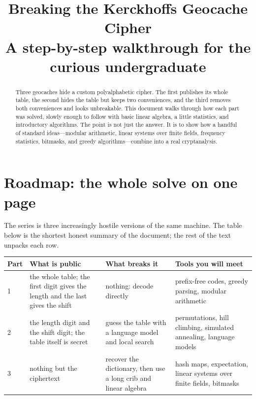 \documentclass[11pt]{article}
\title{Breaking the Kerckhoffs Geocache Cipher\\\large A step-by-step walkthrough for the curious undergraduate}
\author{}
\date{}
\begin{document}
\maketitle

\begin{abstract}
Three geocaches hide a custom polyalphabetic cipher.  The first publishes its
whole table, the second hides the table but keeps two conveniences, and the
third removes both conveniences and looks unbreakable.
This document walks through how each part was solved, slowly enough to follow
with basic linear algebra, a little statistics, and introductory algorithms.
The point is not just the answer.  It is to show how a handful of standard
ideas---modular arithmetic, linear systems over finite fields, frequency
statistics, bitmasks, and greedy algorithms---combine into a real
cryptanalysis.
\end{abstract}

\tableofcontents

\section{Roadmap: the whole solve on one page}\label{sec:roadmap}

The series is three increasingly hostile versions of the same machine.  The
table below is the shortest honest summary of the document; the rest of the
text unpacks each row.

\begin{center}
\small
\setlength{\tabcolsep}{4pt}
\renewcommand{\arraystretch}{1.25}
\begin{tabular}{@{}p{}p{}p{}p{}@{}}
\toprule
\textbf{Part} & \textbf{What is public} & \textbf{What breaks it} & \textbf{Tools you will meet} \\
\midrule
1 & the whole table; the first digit gives the length and the last gives the shift & nothing: decode directly & prefix-free codes, greedy parsing, modular arithmetic \\
2 & the length digit and the shift digit; the table itself is secret & guess the table with a language model and local search & permutations, hill climbing, simulated annealing, language models \\
3 & nothing but the ciphertext & recover the dictionary, then use a long crib and linear algebra & hash maps, expectation, linear systems over finite fields, bitmasks \\
\bottomrule
\end{tabular}
\end{center}
\end{document}

